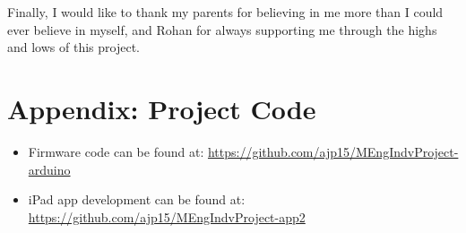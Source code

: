 \documentclass[12pt,twoside]{article}
\begin{document}
Finally, I would like to thank my parents for believing in me more than I could ever believe in myself, and Rohan for always supporting me through the highs and lows of this project.

\newpage



\newpage

\appendix

\section{Appendix: Project Code}
\label{appendix: a}
\begin{itemize}
    \item Firmware code can be found at: \newline \url{https://github.com/ajp15/MEngIndvProject-arduino}
    \item iPad app development can be found at: \newline \url{https://github.com/ajp15/MEngIndvProject-app2}
\end{itemize}
\end{document}
